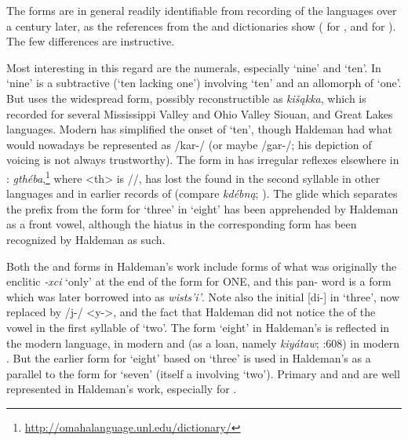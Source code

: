 \documentclass[output=paper]{LSP/langsci}
\begin{document}
The forms are in general readily identifiable from recording of the languages over a century later, as the references from the  and  dictionaries show (\citealt{CumberlandRankin2012} for , and \citealt{Quintero2009} for ). The few differences are instructive.    

 
Most interesting in this regard are the numerals, especially `nine' and `ten'.  In  `nine' is a subtractive  (`ten lacking one') involving `ten' and an allomorph of `one'.  But   uses the widespread form, possibly reconstructible as \textit{ki\v{s}\k{a}kka}, which is recorded for several Mississippi Valley and Ohio Valley Siouan,  and Great Lakes  languages.   Modern  has simplified the onset of `ten', though Haldeman had what would nowadays be represented as /kar-/ (or maybe /gar-/; his depiction of voicing is not always trustworthy).  The form in  has irregular reflexes elsewhere in :    \textit{gthéba},\footnote{\url{http://omahalanguage.unl.edu/dictionary/}} where <th> is //, has lost the  found in the second syllable in other  languages and in earlier records of  (compare  \textit{kdébn\k{a}}; \citealt[3]{Rankin1982}). The glide which separates the prefix from the form for `three' in  `eight' has been apprehended by Haldeman as a front vowel, although the hiatus in the corresponding  form has been recognized by Haldeman as such.  

Both the  and  forms in Haldeman's work include forms of what was originally the enclitic \textit{-xci} `only' at the end of the form for ONE, and this pan- word is a form which was later borrowed into  as \textit{wists'i'}.  Note also the initial [di-] in  `three', now replaced by /j-/ <y->, and the fact that Haldeman did not notice the  of the vowel in the first syllable of  `two'.  The form `eight' in Haldeman's  is reflected in the modern language, in modern  and (as a loan, namely \textit{kiy\'ataw}; \citealt{Rood1996}:608) in modern . But the earlier form for `eight' based on `three' is used in Haldeman's  as a parallel to the form for `seven' (itself a  involving `two'). Primary  and  and  are well represented in Haldeman's work, especially for .  
 
\end{document}
